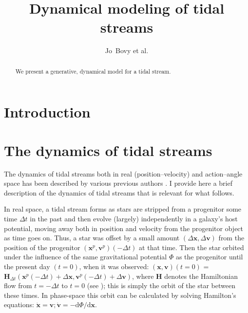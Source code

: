 \documentclass[12pt,preprint]{aastex}
\newcounter{address}
\newcommand{\etal}{et al.}
\newcommand{\dd}{\mathrm{d}}
\newcommand{\eg}{e.g.}
\renewcommand{\vec}[1]{\ensuremath{\mathbf{#1}}}
\newcommand{\vecx}{\ensuremath{\vec{x}}}
\newcommand{\vecv}{\ensuremath{\vec{v}}}
\newcommand{\vech}{\ensuremath{\vec{H}}}
\begin{document}
\title{Dynamical modeling of tidal streams}
\author{Jo~Bovy \etal}

\begin{abstract} 
  We present a generative, dynamical model for a tidal stream.
\end{abstract}



\section{Introduction}




\section{The dynamics of tidal streams}\label{sec:dynamics}

The dynamics of tidal streams both in real (position--velocity) and
action--angle space has been described by various previous authors
\citep[\eg,][]{Helmi99a,Tremaine99a,SomeJohnstonPaper,Sanders13a}. I
provide here a brief description of the dynamics of tidal streams that
is relevant for what follows.

In real space, a tidal stream forms as stars are stripped from a
progenitor some time $\Delta t$ in the past and then evolve (largely)
independently in a galaxy's host potential, moving away both in
position and velocity from the progenitor object as time goes
on. Thus, a star was offset by a small amount $(\Delta \vecx,\Delta
\vecv)$ from the position of the progenitor $(\vecx^p,\vecv^p)(-\Delta
t)$ at that time. Then the star orbited under the influence of the
same gravitational potential $\Phi$ as the progenitor until the
present day $(t=0)$, when it was observed: $(\vecx,\vecv)(t=0)$ =
$\vech_{\Delta t}(\vecx^p(-\Delta t)+\Delta \vecx,\vecv^p(-\Delta
t)+\Delta \vecv)$, where $\vech$ denotes the Hamiltonian flow from
$t=-\Delta t$ to $t=0$ (see \citealt{binneytremaine}); this is simply
the orbit of the star between these times. In phase-space this orbit
can be calculated by solving Hamilton's equations: $\dot{\vecx} =
\vecv; \dot{\vecv} = - \dd \Phi / \dd \vecx$.
\end{document}
